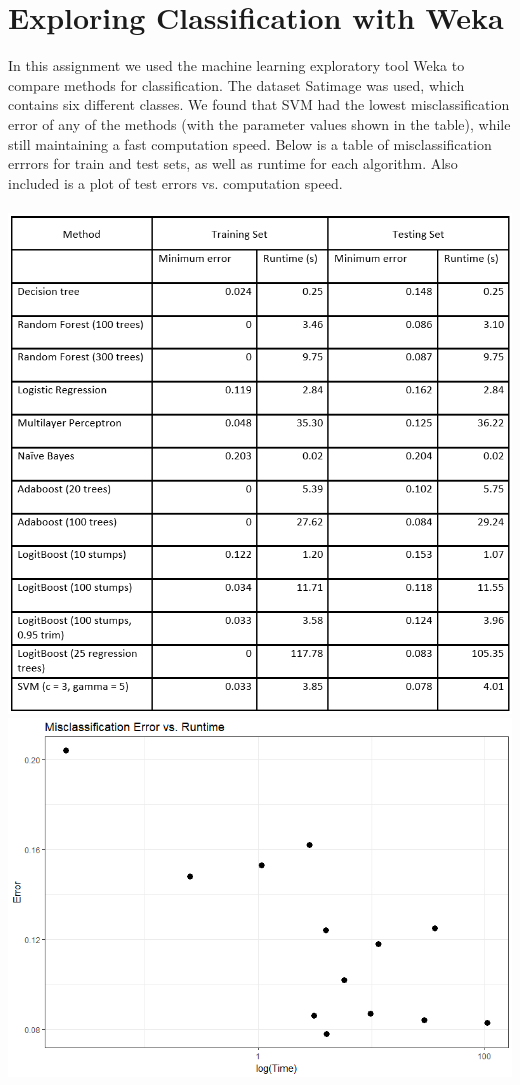 \documentclass[letter]{article} %
\begin{document}
\setlength{\headsep}{0.5 in}

\section*{Exploring Classification with Weka}

\quad \quad In this assignment we used the machine learning exploratory tool Weka to compare methods for classification. The dataset Satimage was used, which contains six different classes. We found that SVM had the lowest misclassification error of any of the methods (with the parameter values shown in the table), while still maintaining a fast computation speed. Below is a table of misclassification errrors for train and test sets, as well as runtime for each algorithm. Also included is a plot of test errors vs. computation speed. \\ \\
\includegraphics[scale=0.9]{table} \\
\includegraphics[scale=1]{plot}
\end{document}

